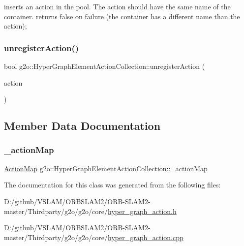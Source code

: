 inserts an action in the pool. The action should have the same name of the container. returns false on failure (the container has a different name than the action); \mbox{\label{classg2o_1_1_hyper_graph_element_action_collection_a6dc646c0dd8fbf9b54fb8161348af5e6}} 
\subsubsection{\texorpdfstring{unregister\+Action()}{unregisterAction()}}
{\footnotesize\ttfamily bool g2o\+::\+Hyper\+Graph\+Element\+Action\+Collection\+::unregister\+Action (\begin{DoxyParamCaption}\item[{\mbox{\hyperlink{classg2o_1_1_hyper_graph_element_action}{Hyper\+Graph\+Element\+Action}} $\ast$}]{action }\end{DoxyParamCaption})}



\subsection{Member Data Documentation}
\mbox{\label{classg2o_1_1_hyper_graph_element_action_collection_a637c13fca95eacab38ee82eedd3669e4}} 
\subsubsection{\texorpdfstring{\+\_\+action\+Map}{\_actionMap}}
{\footnotesize\ttfamily \mbox{\hyperlink{classg2o_1_1_hyper_graph_element_action_abc889fc90ae1bbb63d90c7993777417a}{Action\+Map}} g2o\+::\+Hyper\+Graph\+Element\+Action\+Collection\+::\+\_\+action\+Map\hspace{0.3cm}{\ttfamily [protected]}}



The documentation for this class was generated from the following files\+:\begin{DoxyCompactItemize}
\item 
D\+:/github/\+V\+S\+L\+A\+M/\+O\+R\+B\+S\+L\+A\+M2/\+O\+R\+B-\/\+S\+L\+A\+M2-\/master/\+Thirdparty/g2o/g2o/core/\mbox{\hyperlink{hyper__graph__action_8h}{hyper\+\_\+graph\+\_\+action.\+h}}\item 
D\+:/github/\+V\+S\+L\+A\+M/\+O\+R\+B\+S\+L\+A\+M2/\+O\+R\+B-\/\+S\+L\+A\+M2-\/master/\+Thirdparty/g2o/g2o/core/\mbox{\hyperlink{hyper__graph__action_8cpp}{hyper\+\_\+graph\+\_\+action.\+cpp}}\end{DoxyCompactItemize}
